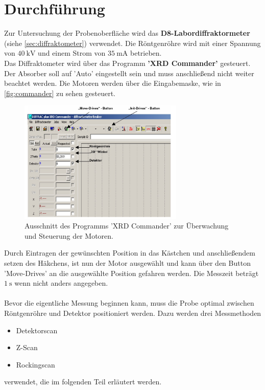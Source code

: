 \section{Durchführung}
\label{sec:Durchführung}
Zur Untersuchung der Probenoberfläche wird das \textbf{D8-Labordiffraktormeter} (siehe \autoref{sec:diffraktometer}) verwendet.
Die Röntgenröhre wird mit einer Spannung von $\SI{40}{\kilo\volt}$ und einem Strom von $\SI{35}{\milli\ampere}$ betrieben.
\\
Das Diffraktometer wird über das Programm \textbf{'XRD Commander'} gesteuert.
Der Absorber soll auf 'Auto' eingestellt sein und muss anschließend nicht weiter beachtet werden.
Die Motoren werden über die Eingabemaske, wie in \autoref{fig:commander} zu sehen gesteuert.
\begin{figure}
    \centering
    \includegraphics[width=0.7\textwidth]{content/data/xrd_commander.jpg}
    \caption{Ausschnitt des Programms 'XRD Commander' zur Überwachung und Steuerung der Motoren.\cite[3]{anleitung}}
    \label{fig:commander}
\end{figure}
Durch Eintragen der gewünschten Position in das Kästchen und anschließendem setzen des Häkchens, ist nun der Motor ausgewählt und kann über den Button 'Move-Drives' an die ausgewählte Position gefahren werden.
Die Messzeit beträgt $\SI{1}{\second}$ wenn nicht anders angegeben.
\\
\\
Bevor die eigentliche Messung beginnen kann, muss die Probe optimal zwischen Röntgenröhre und Detektor positioniert werden.
Dazu werden drei Messmethoden
\begin{itemize}
    \item Detektorscan
    \item Z-Scan
    \item Rockingscan
\end{itemize}
verwendet, die im folgenden Teil erläutert werden.
